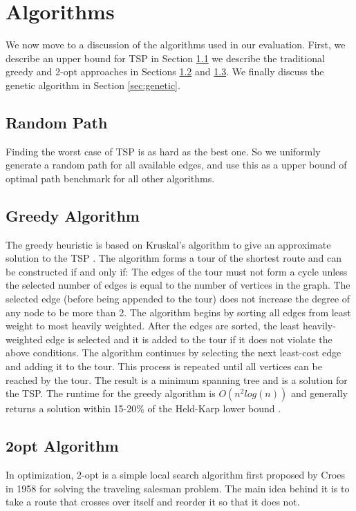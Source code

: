 \documentclass[10pt,twocolumn,letterpaper]{article}
\begin{document}
\section{Algorithms}\label{sec:algo}
We now move to a discussion of the algorithms used in
our evaluation. First, we describe an upper bound for TSP in Section \ref{sec:rand} we describe the traditional greedy and 2-opt approaches in Sections \ref{sec:greedy} and \ref{sec:2opt}. We finally
discuss the genetic algorithm in Section \ref{sec:genetic}.

\subsection{Random Path}\label{sec:rand}
Finding the worst case of TSP is as hard as the best one.
So we uniformly generate a random path for all available edges, 
and use this as a upper bound of optimal path benchmark for all other algorithms.

\subsection{Greedy Algorithm}\label{sec:greedy}
The greedy heuristic is based on Kruskal’s algorithm to
give an approximate solution to the TSP \cite{kim1998comparison}. The algorithm
forms a tour of the shortest route and can be constructed if and only if:
The edges of the tour must not form a cycle unless
the selected number of edges is equal to the number of
vertices in the graph.
The selected edge (before being appended to the tour)
does not increase the degree of any node to be more
than 2.
The algorithm begins by sorting all edges from least weight
to most heavily weighted. After the edges are sorted, the
least heavily-weighted edge is selected and it is added to the tour if it does not violate the above conditions. The algorithm continues by selecting the next least-cost edge and adding it to the tour. This process is repeated until all vertices can be reached by the tour. The result is a minimum
spanning tree and is a solution for the TSP. The runtime for
the greedy algorithm is $O(n^2log(n))$ and generally returns a solution within 15-20\% of the Held-Karp lower bound \cite{rosenkrantz1977analysis}.

\subsection{2opt Algorithm}\label{sec:2opt}
In optimization, 2-opt is a simple local search algorithm first proposed by Croes in 1958 for solving the traveling salesman problem\cite{croes1958method}.
The main idea behind it is to take a route that crosses over itself and reorder it so that it does not.
\end{document}
